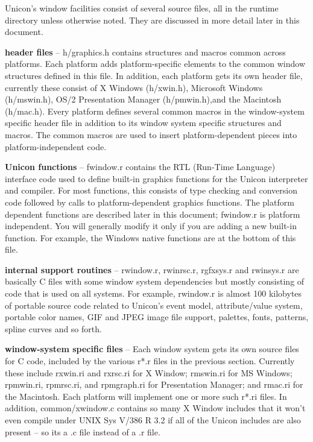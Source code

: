 Unicon's window facilities consist of several source files, all in the
runtime directory unless otherwise noted. They are discussed in more
detail later in this document.

\textbf{header files} -- \textsf{h/graphics.h} contains structures and
macros common across platforms. Each platform adds platform-specific
elements to the common window structures defined in this file. In
addition, each platform gets its own header file, currently these
consist of X Windows (\textsf{h/xwin.h}), Microsoft Windows
(\textsf{h/mswin.h}), OS/2 Presentation Manager
(\textsf{h/pmwin.h}),and the Macintosh (\textsf{h/mac.h}). Every
platform defines several common macros in the window-system specific
header file in addition to its window system specific structures and
macros. The common macros are used to insert platform-dependent pieces
into platform-independent code.

\textbf{Unicon functions} -- \textsf{fwindow.r} contains the RTL
(Run-Time Language) interface code used to define built-in graphics
functions for the Unicon interpreter and compiler. For most functions,
this consists of type checking and conversion code followed by calls
to platform-dependent graphics functions. The platform dependent
functions are described later in this document; \textsf{fwindow.r} is
platform independent. You will generally modify it only if you are
adding a new built-in function. For example, the Windows native
functions are at the bottom of this file.

\textbf{internal support routines} -- \textsf{rwindow.r, rwinrsc.r,
rgfxsys.r} and \textsf{rwinsys.r} are basically C files with some
window system dependencies but mostly consisting of code that is used
on all systems. For example, \textsf{rwindow.r} is almost 100
kilobytes of portable source code related to Unicon's event model,
attribute/value system, portable color names, GIF and JPEG image file
support, palettes, fonts, patterns, spline curves and so forth.

\textbf{window-system specific files} -- Each window system gets its
own source files for C code, included by the various \textsf{r*.r}
files in the previous section. Currently these include
\textsf{rxwin.ri} and \textsf{rxrsc.ri} for X Window;
\textsf{rmswin.ri} for MS Windows; \textsf{rpmwin.ri},
\textsf{rpmrsc.ri}, and \textsf{rpmgraph.ri} for Presentation Manager;
and \textsf{rmac.ri} for the Macintosh. Each platform will implement
one or more such \textsf{r*.ri} files. In addition,
\textsf{common/xwindow.c} contains so many X Window includes that it
won't even compile under UNIX Sys V/386 R 3.2 if all of the Unicon
includes are also present -- so its a \textsf{.c} file instead of a
\textsf{.r} file.

